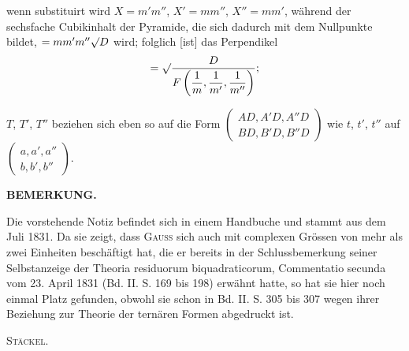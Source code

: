 
\noindent wenn substituirt wird $X = m'm''$, $X' = mm''$, $X'' = mm'$, während der sechsfache
Cubikinhalt der Pyramide, die sich dadurch mit dem Nullpunkte bildet, $= mm'm''\mathord{\surd}D$
wird; folglich [ist] das Perpendikel
\[
= \mathord{\surd}\dfrac{D}{F\left(\dfrac{1}{m}, \dfrac{1}{m'}, \dfrac{1}{m''}\right)};
\]

$T$, $T'$, $T''$ beziehen sich eben so auf die Form $\begin{pmatrix} AD, A'D, A''D \\ BD, B'D, B''D \end{pmatrix}$
wie $t$, $t'$, $t''$ auf $\begin{pmatrix} a, a', a'' \\ b, b', b'' \end{pmatrix}$.



\begin{center}
\bfseries BEMERKUNG.
\end{center}

Die vorstehende Notiz befindet sich in einem Handbuche und stammt aus dem Juli 1831. Da sie
zeigt, dass \textsc{Gauss} sich auch mit complexen Grössen von mehr als zwei Einheiten beschäftigt
hat, die er bereits in der Schlussbemerkung seiner Selbstanzeige der Theoria residuorum
biquadraticorum, Commentatio secunda vom 23. April 1831 (Bd. II. S. 169 bis 198) erwähnt
hatte, so hat sie hier noch einmal Platz gefunden, obwohl sie schon in Bd. II. S. 305 bis
307 wegen ihrer Beziehung zur Theorie der ternären Formen abgedruckt ist.
\begin{flushright}
\textsc{Stäckel.}
\end{flushright}


